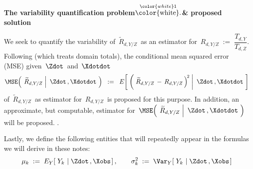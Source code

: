 \vskip 0.1cm
\begin{center}
\begin{minipage}{5.5in}
\begin{tcolorbox}[arc=8px, colback=white, colframe=black]
\begin{center}
\textbf{The variability quantification problem$\overset{{\color{white}1}}{\textnormal{\color{white}.}}$\& proposed solution}
\end{center}
We seek to quantify the variability of
\,$\widetilde{R}_{d,Y/Z}$\,
as an estimator for
\,$R_{d,Y/Z} \; := \; \dfrac{T_{d,Y}}{T_{d,Z}}$.
\vskip 0.1cm
Following \cite{Beaumont2011} (which treats domain totals),
the conditional mean squared error (MSE) given \,$\Zdot$\, and \,$\Xdotdot$\,
\begin{equation*}
\MSE\!\left(\;
    \left.
    \widetilde{R}_{d,Y/Z}
    \;\right\vert\!
    \begin{array}{c} \Zdot\,,\Xdotdot \end{array}
    \!\right)
\;\; := \;\;
    E\!\left[\;\left(\,
        \left.
        \widetilde{R}_{d,Y/Z}
        \, - \,
        R_{d,Y/Z}
        \,\right)^{\!2}
        \;\right\vert\!
        \begin{array}{c} \Zdot\,,\Xdotdot \end{array}
        \!\right]
\end{equation*}
of
\,$\widetilde{R}_{d,Y/Z}$\,
as estimator for
\,$R_{d,Y/Z}$\,
is proposed for this purpose.
\vskip 0.3cm
\noindent
In addition, an approximate, but computable, estimator for
\,$
\MSE\!\left(\;
    \left.
    \widetilde{R}_{d,Y/Z}
    \;\right\vert\!
    \begin{array}{c} \Zdot\,,\Xdotdot \end{array}
    \!\right)
$\,
will be proposed.
\vskip -0.25cm
{\color{white}.}
\end{tcolorbox}
\end{minipage}
\end{center}
\vskip 0.2cm
\noindent
Lastly, we define the following entities that will repeatedly appear
in the formulas we will derive in these notes:
\begin{equation*}
\mu_{k}
\; := \;
    E_{Y}\!\left[\;Y_{k}\,\left\vert\;\Zdot\,,\Xobs\right.\right],
\quad\quad
\sigma_{k}^{2}
\; := \;
    \Var_{Y}\!\left[\;
        Y_{k}
        \,\left\vert\;
        \Zdot\,,\Xobs
        \right.
        \right]
\end{equation*}
